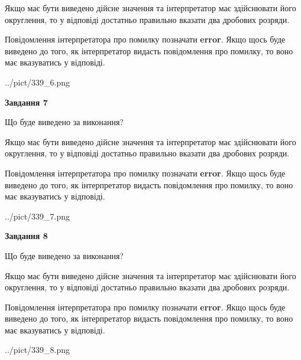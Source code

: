 \documentclass[12pt, ukrainian]{article}
\begin{document}
{\begin {Large}
Якщо має бути виведено дійсне значення та інтерпретатор має здійснювати його округлення, 
то у відповіді достатньо правильно вказати два дробових розряди.

Повідомлення інтерпретатора про помилку позначати \textbf{error}.
Якщо щось буде виведено до того, як інтерпретатор видасть повідомлення про помилку, 
то воно має вказуватись у відповіді. \par

\begin{center}
	{../pict/339_6.png}
\end{center}
\newpage

{\begin {center}\textbf{Завдання 7}\end {center}}\par
Що буде виведено за виконання? \par

Якщо має бути виведено дійсне значення та інтерпретатор має здійснювати його округлення, 
то у відповіді достатньо правильно вказати два дробових розряди.

Повідомлення інтерпретатора про помилку позначати \textbf{error}.
Якщо щось буде виведено до того, як інтерпретатор видасть повідомлення про помилку, 
то воно має вказуватись у відповіді. \par

\begin{center}
	{../pict/339_7.png}
\end{center}
\newpage

{\begin {center}\textbf{Завдання 8}\end {center}}\par
Що буде виведено за виконання? \par

Якщо має бути виведено дійсне значення та інтерпретатор має здійснювати його округлення, 
то у відповіді достатньо правильно вказати два дробових розряди.

Повідомлення інтерпретатора про помилку позначати \textbf{error}.
Якщо щось буде виведено до того, як інтерпретатор видасть повідомлення про помилку, 
то воно має вказуватись у відповіді. \par

\begin{center}
	{../pict/339_8.png}
\end{center}
\newpage


\end{Large}}
\end{document}
